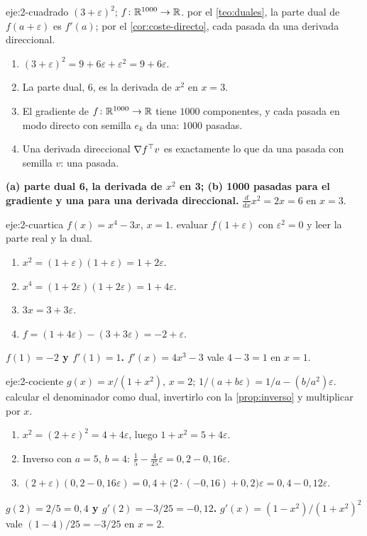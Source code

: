 \begin{solucion}{eje:2-cuadrado}
\datos $(3+\varepsilon)^{2}$; $f\colon\mathbb{R}^{1000}\to\mathbb{R}$.
\planteamiento por el \cref{teo:duales}, la parte dual de $f(a+\varepsilon)$ es $f'(a)$; por el \cref{cor:coste-directo}, cada pasada da una derivada direccional.
\pasos
\begin{enumerate}[label=\arabic*.]
  \item $(3+\varepsilon)^{2}=9+6\varepsilon+\varepsilon^{2}=9+6\varepsilon$.
  \item La parte dual, 6, es la derivada de $x^{2}$ en $x=3$.
  \item El gradiente de $f\colon\mathbb{R}^{1000}\to\mathbb{R}$ tiene $1000$ componentes, y cada pasada en modo directo con semilla $e_k$ da una: $1000$ pasadas.
  \item Una derivada direccional $\nabla f^{\top} v$ es exactamente lo que da una pasada con semilla $v$: una pasada.
\end{enumerate}
\resultado \textbf{(a) parte dual 6, la derivada de $x^{2}$ en 3; (b) 1000 pasadas para el gradiente y una para una derivada direccional.}
\comprobacion $\frac{d}{dx}x^{2}=2x=6$ en $x=3$.
\end{solucion}

\begin{solucion}{eje:2-cuartica}
\datos $f(x)=x^{4}-3x$, $x=1$.
\planteamiento evaluar $f(1+\varepsilon)$ con $\varepsilon^{2}=0$ y leer la parte real y la dual.
\pasos
\begin{enumerate}[label=\arabic*.]
  \item $x^{2}=(1+\varepsilon)(1+\varepsilon)=1+2\varepsilon$.
  \item $x^{4}=(1+2\varepsilon)(1+2\varepsilon)=1+4\varepsilon$.
  \item $3x=3+3\varepsilon$.
  \item $f=(1+4\varepsilon)-(3+3\varepsilon)=-2+\varepsilon$.
\end{enumerate}
\resultado \textbf{$f(1)=-2$ y $f'(1)=1$.}
\comprobacion $f'(x)=4x^{3}-3$ vale $4-3=1$ en $x=1$.
\end{solucion}

\begin{solucion}{eje:2-cociente}
\datos $g(x)=x/(1+x^{2})$, $x=2$; $1/(a+b\varepsilon)=1/a-(b/a^{2})\varepsilon$.
\planteamiento calcular el denominador como dual, invertirlo con la \cref{prop:inverso} y multiplicar por $x$.
\pasos
\begin{enumerate}[label=\arabic*.]
  \item $x^{2}=(2+\varepsilon)^{2}=4+4\varepsilon$, luego $1+x^{2}=5+4\varepsilon$.
  \item Inverso con $a=5$, $b=4$: $\tfrac15-\tfrac{4}{25}\varepsilon=0{,}2-0{,}16\varepsilon$.
  \item $(2+\varepsilon)(0{,}2-0{,}16\varepsilon)=0{,}4+\bigl(2\cdot(-0{,}16)+0{,}2\bigr)\varepsilon=0{,}4-0{,}12\varepsilon$.
\end{enumerate}
\resultado \textbf{$g(2)=2/5=0{,}4$ y $g'(2)=-3/25=-0{,}12$.}
\comprobacion $g'(x)=(1-x^{2})/(1+x^{2})^{2}$ vale $(1-4)/25=-3/25$ en $x=2$.
\end{solucion}


